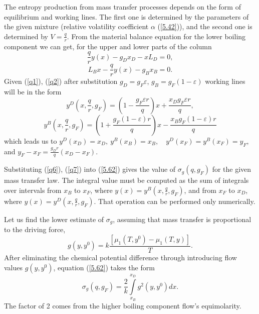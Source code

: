 \documentclass[12pt]{article}
\begin{document}
The entropy production from mass transfer processes depends on the form of equilibrium and working lines. The first one is determined by the parameters of the given mixture (relative volatility coefficient $\alpha$ (\ref{5.42})), and the second one is determined by $V=\frac{q}{r}$. From the material balance equation for the lower boiling component we can get, for the upper and lower parts of the column
\begin{equation}
\frac{q}{r}y(x)- g_{D} x_{D} - x L_{D} =0,
\label{q4}
\end{equation}
\begin{equation}
L_{B} x - \frac{q}{r}y (x)- g_{B} x_{B} =0.
\label{q5}
\end{equation}
Given (\ref{q1}), (\ref{q2}) after substitution $g_D=g_F\varepsilon$, $g_B=g_F(1-\varepsilon)$ working lines will be in the form
\begin{equation}
y^{D} (x, \frac{q}{r}, g_F)= \left( 1- \frac{g_F\varepsilon r}{q} \right) x + \frac{x_{D}
g_F\varepsilon r}{q},
\label{q6}
\end{equation}
\begin{equation}
y^{B} (x, \frac{q}{r}, g_{F})= \left( 1+ \frac{g_F(1-\varepsilon)r}{q} \right) x - \frac{x_{B}
g_F(1-\varepsilon)r}{q}
\label{q7}
\end{equation}
which leads us to $y^{D}(x_D)=x_D,~y^{B}(x_B)=x_B,\quad y^{D}(x_F)= y^{B}(x_F)=y_F$, and $y_F-x_F=\frac{g_D r}{q}(x_D-x_F)$.

Substituting (\ref{q6}), (\ref{q7}) into (\ref{5.62}) gives the value of $\sigma_g (q, g_{F})$ for the given mass transfer law. The integral value must be computed as the sum of integrals over intervals from $x_{B}$ to $x_{F}$, where $y(x)=
y^{B} (x, \frac{q}{r},g_F)$, and from $x_{F}$ to $x_{D}$, where $y(x)= y^{D} (x, \frac{q}{r},g_F)$. That operation can be performed only numerically.

Let us find the lower estimate of $\sigma_g$, assuming that mass transfer  is proportional to the driving force,
\begin{equation}
g(y, y^0)= k\frac{[ \mu_1(T, y^0)-\mu_1(T, y)]}{T}.
	\label{r8}
\end{equation}
After eliminating the chemical potential difference through introducing flow values $g(y, y^0)$, equation (\ref{5.62}) takes the form
\begin{equation}
\sigma_g (q,g_F)=\frac{2}{k}\int\limits^{x_D}_{x_B} g^2(y, y^0)dx .
	\label{r4}
\end{equation}
The factor of 2 comes from the higher boiling component flow's equimolarity.
\end{document}
